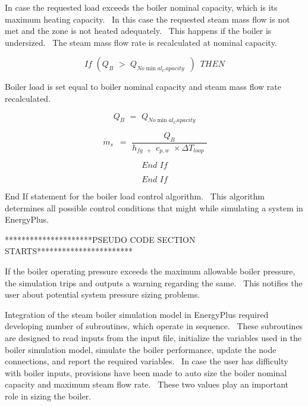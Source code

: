 In case the requested load exceeds the boiler nominal capacity, which is its maximum heating capacity.~ In this case the requested steam mass flow is not met and the zone is not heated adequately.~ This happens if the boiler is undersized.~ The steam mass flow rate is recalculated at nominal capacity.

\begin{equation}
If\,\,({Q_B}\,\, > \,\,{Q_{No\min al_Capacity}}\,\,\,)\,\,\,THEN
\end{equation}

Boiler load is set equal to boiler nominal capacity and steam mass flow rate recalculated.

\begin{equation}
{Q_B}\,\, = \,\,{Q_{No\min al_Capacity}}
\end{equation}

\begin{equation}
\,{\dot m_s}\,\,\, = \,\,\frac{{{Q_B}}}{{{h_{fg\,\,\, + }}\,\,{c_{p,w}}\,\, \times \Delta {T_{loop}}\,\,}}
\end{equation}

\begin{equation}
End\,\,If
\end{equation}

\begin{equation}
End\,\,If
\end{equation}

End If statement for the boiler load control algorithm.~ This algorithm determines all possible control conditions that might while simulating a system in EnergyPlus.

*********************PSEUDO CODE SECTION STARTS***********************

If the boiler operating pressure exceeds the maximum allowable boiler pressure, the simulation trips and outputs a warning regarding the same.~ This notifies the user about potential system pressure sizing problems.

Integration of the steam boiler simulation model in EnergyPlus required developing number of subroutines, which operate in sequence.~ These subroutines are designed to read inputs from the input file, initialize the variables used in the boiler simulation model, simulate the boiler performance, update the node connections, and report the required variables.~ In case the user has difficulty with boiler inputs, provisions have been made to auto size the boiler nominal capacity and maximum steam flow rate.~ These two values play an important role in sizing the boiler.

